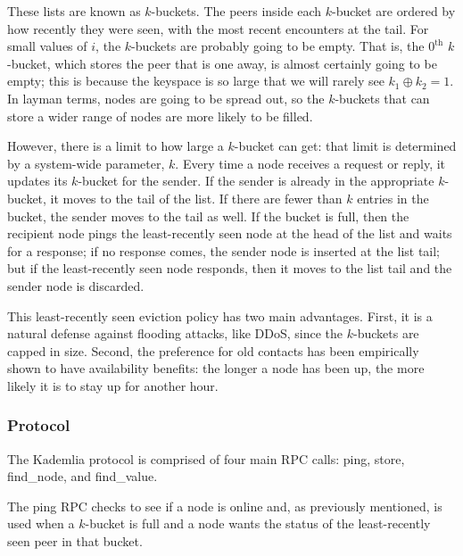 \documentclass[12pt,twocolumn]{article}
\begin{document}
These lists are known as $k$-buckets.
The peers inside each $k$-bucket are ordered by how recently they were seen, with the most recent encounters at the tail.
For small values of $i$, the $k$-buckets are probably going to be empty.
That is, the $0^{\mathrm{th}}$ $k$-bucket, which stores the peer that is one away, is almost certainly going to be empty; this is because the keyspace is so large that we will rarely see $k_1 \oplus k_2 = 1$.
In layman terms, nodes are going to be spread out, so the $k$-buckets that can store a wider range of nodes are more likely to be filled.

However, there is a limit to how large a $k$-bucket can get: that limit is determined by a system-wide parameter, $k$. Every time a node receives a request or reply, it updates its $k$-bucket for the sender. If the sender is already in the appropriate $k$-bucket, it moves to the tail of the list. If there are fewer than $k$ entries in the bucket, the sender moves to the tail as well. If the bucket is full, then the recipient node pings the least-recently seen node at the head of the list and waits for a response; if no response comes, the sender node is inserted at the list tail; but if the least-recently seen node responds, then it moves to the list tail and the sender node is discarded.

This least-recently seen eviction policy has two main advantages. First, it is a natural defense against flooding attacks, like DDoS, since the $k$-buckets are capped in size. Second, the preference for old contacts has been empirically shown to have availability benefits: the longer a node has been up, the more likely it is to stay up for another hour.

\subsubsection{Protocol}

\newcommand{\findNode}{}
\def\findNode/{{\sc find\_node}}
\newcommand{\findValue}{}
\def\findValue/{{\sc find\_value}}
\newcommand{\ping}{}
\def\ping/{{\sc ping}}
\newcommand{\store}{}
\def\store/{{\sc store}}

The Kademlia protocol is comprised of four main RPC calls: \ping/, \store/, \findNode/, and \findValue/.

The \ping/ RPC checks to see if a node is online and, as previously mentioned, is used when a $k$-bucket is full and a node wants the status of the least-recently seen peer in that bucket.
\end{document}
